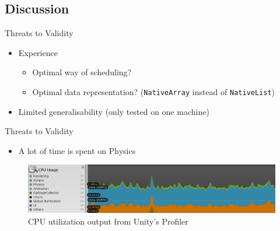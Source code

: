 \begin{frame}[fragile]{\secname}{\subsecname}
\end{frame}

\subsection{Discussion}
\begin{frame}{\secname}{\subsecname}
	Threats to Validity
	\begin{itemize}
		\item<2-> Experience
		\begin{itemize}
			\item Optimal way of scheduling?
			\item Optimal data representation? (\texttt{NativeArray} instead of \texttt{NativeList})
		\end{itemize}
		\item<3-> Limited generalisability (only tested on one machine)
	\end{itemize}
\end{frame}

\begin{frame}{\secname}{\subsecname}
	Threats to Validity
	\begin{itemize}
		\item A lot of time is spent on Physics
	\end{itemize}
	\begin{figure}[h!]
		\centering
		\includegraphics[width=\textwidth]{pictures/profiling.png}
		\caption{CPU utilization output from Unity's Profiler}
		\label{fig:unity:profiler}
	\end{figure}
\end{frame}

